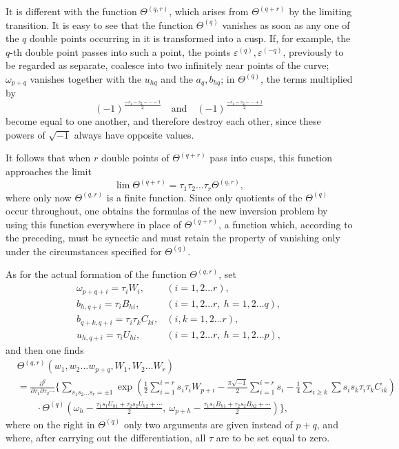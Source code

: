 \documentclass[10pt]{article}
\begin{document}
It is different with the function \(\Theta^{(q,r)}\), which arises from \(\Theta^{(q+r)}\) by the limiting transition. It is easy to see that the function \(\Theta^{(q)}\) vanishes as soon as any one of the \(q\) double points occurring in it is transformed into a cusp. If, for example, the \(q\)-th double point passes into such a point, the points \(\varepsilon^{(q)},\varepsilon^{(-q)}\), previously to be regarded as separate, coalesce into two infinitely near points of the curve; \(\omega_{p+q}\) vanishes together with the \(u_{hq}\) and the \(a_q,b_{hq}\); in \(\Theta^{(q)}\), the terms multiplied by
\[
(-1)^{\frac{-s_1-s_2-\cdots-1}{2}}
\quad\text{and}\quad
(-1)^{\frac{-s_1-s_2-\cdots+1}{2}}
\]
become equal to one another, and therefore destroy each other, since these powers of \(\sqrt{-1}\) always have opposite values.

It follows that when \(r\) double points of \(\Theta^{(q+r)}\) pass into cusps, this function approaches the limit
\[
\lim \Theta^{(q+r)}=\tau_1\tau_2\ldots\tau_r\Theta^{(q,r)},
\]
where only now \(\Theta^{(q,r)}\) is a finite function. Since only quotients of the \(\Theta^{(q)}\) occur throughout, one obtains the formulas of the new inversion problem by using this function everywhere in place of \(\Theta^{(q+r)}\), a function which, according to the preceding, must be synectic and must retain the property of vanishing only under the circumstances specified for \(\Theta^{(q)}\).

As for the actual formation of the function \(\Theta^{(q,r)}\), set
\[
\begin{array}{lll}
\omega_{p+q+i}=\tau_iW_i,&(i=1,2\ldots r),\\
b_{h,q+i}=\tau_iB_{hi},&(i=1,2\ldots r,\ h=1,2\ldots q),\\
b_{q+k,q+i}=\tau_i\tau_kC_{ki},&(i,k=1,2\ldots r),\\
u_{h,q+i}=\tau_iU_{hi},&(i=1,2\ldots r,\ h=1,2\ldots p),
\end{array}
\]
and then one finds
\[
\begin{aligned}
&\Theta^{(q,r)}(w_1,w_2\ldots w_{p+q},W_1,W_2\ldots W_r)\\
&=\frac{\partial^q}{\partial\tau_1\partial\tau_2\cdots}
\Bigg\{\sum_{s_1s_2\ldots s_r=\pm1}
\exp\!\left(\frac12\sum_{i=1}^{i=r}s_i\tau_iW_{p+i}
-\frac{\pi\sqrt{-1}}2\sum_{i=1}^{i=r}s_i
-\frac14\sum_{i\ge k}\sum s_is_k\tau_i\tau_kC_{ik}\right)\\
&\qquad\cdot
\Theta^{(q)}\!\left(\omega_h-\frac{\tau_1s_1U_{h1}+\tau_2s_2U_{h2}+\cdots}{2},\
\omega_{p+h}-\frac{\tau_1s_1B_{h1}+\tau_2s_2B_{h2}+\cdots}{2}\right)\Bigg\},
\end{aligned}
\]
where on the right in \(\Theta^{(q)}\) only two arguments are given instead of \(p+q\), and where, after carrying out the differentiation, all \(\tau\) are to be set equal to zero.
\end{document}

